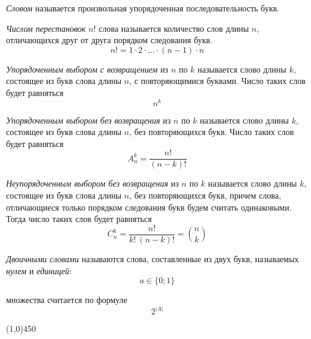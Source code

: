 \documentclass[a4paper,12pt]{article}
\begin{document}
	\textit{Словом} называется произвольная упорядоченная последовательность букв.
	
	\textit{Числом перестановок} $n!$ слова называется количество слов длины $n$, отличающихся друг от друга порядком следования букв.
	\[
	n! = 1 \cdot 2 \cdot \ldots \cdot (n - 1) \cdot n
	\]
	
	\textit{Упорядоченным выбором с возвращением} из $n$ по $k$ называется слово длины $k$, состоящее из букв слова длины $n$, с повторяющимися буквами. Число таких слов будет равняться 
	\[
	n^k
	\]
	
	\textit{Упорядоченным выбором без возвращения} из $n$ по $k$ называется слово длины $k$, состоящее из букв слова длины $n$, без повторяющихся букв. Число таких слов будет равняться
	\[
	A_n^k = \frac{n!}{(n - k)!}
	\]
	
	\textit{Неупорядоченным выбором без возвращения} из $n$ по $k$ называется слово длины $k$, состоящее из букв слова длины $n$, без повторяющихся букв, причем слова, отличающиеся только порядком следования букв будем считать одинаковыми. Тогда число таких слов будет равняться 
	\[
	C_n^k = \frac{n!}{k! \ (n - k)!} = {n \choose k}
	\]
	
	\textit{Двоичными словами} называются слова, составленные из двух букв, называемых \textit{нулем} и \textit{единицей}:
	\[
	a \in \{0; 1\}
	\]
	

	 множества считается по формуле 
	\[
	2 ^ {|A|}
	\]
	
	
	\begin{center}
		\line(1,0){450}
	\end{center}
	
\end{document}
